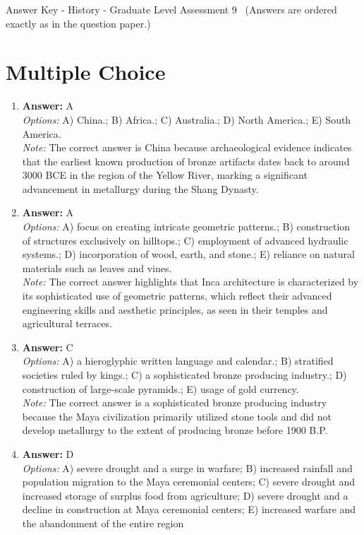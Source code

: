 \documentclass[12pt]{article}
\begin{document}
\begin{center}
Answer Key - History - Graduate Level Assessment 9 \
\small (Answers are ordered exactly as in the question paper.)
\end{center}

\section*{Multiple Choice}
\begin{enumerate}[label=\arabic*.]
\item \textbf{Answer:} A
\\ \textit{Options:} A) China.; B) Africa.; C) Australia.; D) North America.; E) South America.
\\ \textit{Note:} The correct answer is China because archaeological evidence indicates that the earliest known production of bronze artifacts dates back to around 3000 BCE in the region of the Yellow River, marking a significant advancement in metallurgy during the Shang Dynasty.
\item \textbf{Answer:} A
\\ \textit{Options:} A) focus on creating intricate geometric patterns.; B) construction of structures exclusively on hilltops.; C) employment of advanced hydraulic systems.; D) incorporation of wood, earth, and stone.; E) reliance on natural materials such as leaves and vines.
\\ \textit{Note:} The correct answer highlights that Inca architecture is characterized by its sophisticated use of geometric patterns, which reflect their advanced engineering skills and aesthetic principles, as seen in their temples and agricultural terraces.
\item \textbf{Answer:} C
\\ \textit{Options:} A) a hieroglyphic written language and calendar.; B) stratified societies ruled by kings.; C) a sophisticated bronze producing industry.; D) construction of large-scale pyramids.; E) usage of gold currency.
\\ \textit{Note:} The correct answer is a sophisticated bronze producing industry because the Maya civilization primarily utilized stone tools and did not develop metallurgy to the extent of producing bronze before 1900 B.P.
\item \textbf{Answer:} D
\\ \textit{Options:} A) severe drought and a surge in warfare; B) increased rainfall and population migration to the Maya ceremonial centers; C) severe drought and increased storage of surplus food from agriculture; D) severe drought and a decline in construction at Maya ceremonial centers; E) increased warfare and the abandonment of the entire region

\end{enumerate}
\end{document}
